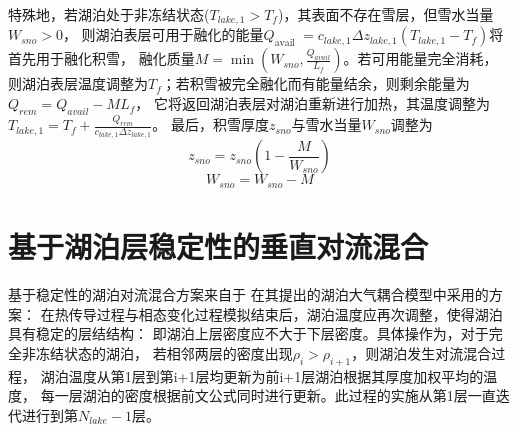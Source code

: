 特殊地，若湖泊处于非冻结状态($T_{lake,1}>T_f$)，其表面不存在雪层，但雪水当量$W_{sno}>0$，
则湖泊表层可用于融化的能量$Q_{\text {avail }}=c_{lake, 1} \Delta z_{lake, 1}\left(T_{lake, 1}-T_{f}\right)$将首先用于融化积雪，
融化质量$M=\min{\left(W_{sno},\frac{Q_{avail}}{L_f}\right)}$。若可用能量完全消耗，
则湖泊表层温度调整为$T_f$；若积雪被完全融化而有能量结余，则剩余能量为$Q_{rem}=Q_{avail}-ML_f$，
它将返回湖泊表层对湖泊重新进行加热，其温度调整为$T_{lake, 1}=T_{f}+\frac{Q_{rem}}{c_{lake, 1} \Delta z_{lake, 1}}$。
最后，积雪厚度$z_{sno}$与雪水当量$W_{sno}$调整为
\begin{equation}
z_{sno}=z_{sno}\left(1-\frac{M}{W_{sno}}\right)
\end{equation}
\begin{equation}
W_{sno}=W_{sno}-M
\end{equation}

\section{基于湖泊层稳定性的垂直对流混合}
基于稳定性的湖泊对流混合方案来自于\citet{hostetler1993interactive,hostetler1994lake} 在其提出的湖泊大气耦合模型中采用的方案：
在热传导过程与相态变化过程模拟结束后，湖泊温度应再次调整，使得湖泊具有稳定的层结结构：
即湖泊上层密度应不大于下层密度。具体操作为，对于完全非冻结状态的湖泊，
若相邻两层的密度出现$\rho_i>\rho_{i+1}$，则湖泊发生对流混合过程，
湖泊温度从第1层到第i+1层均更新为前i+1层湖泊根据其厚度加权平均的温度，
每一层湖泊的密度根据前文公式同时进行更新。此过程的实施从第1层一直迭代进行到第$N_{lake}-1$层。

